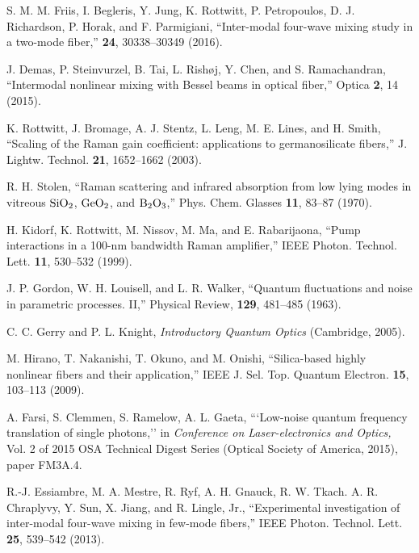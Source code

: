 \documentclass[10pt,letterpaper]{article}
\begin{document}
\begin{thebibliography}{99}
 S. M. M. Friis, I. Begleris, Y. Jung, K. Rottwitt, P. Petropoulos, D. J. Richardson, P. Horak, and F. Parmigiani, ``Inter-modal four-wave mixing study in a two-mode fiber,'' \opex \textbf{24}, 30338--30349 (2016).

 J. Demas, P. Steinvurzel, B. Tai, L. Rish\o{}j, Y. Chen, and S. Ramachandran, ``Intermodal nonlinear mixing with Bessel beams in optical fiber,'' Optica \textbf{2}, 14 (2015).

 K. Rottwitt, J. Bromage, A. J. Stentz, L. Leng, M. E. Lines, and H. Smith, ``Scaling of the Raman gain coefficient: applications to germanosilicate fibers,'' J. Lightw. Technol. \textbf{21}, 1652--1662 (2003).

 R. H. Stolen, ``Raman scattering and infrared absorption from low lying modes in vitreous $\rm SiO_2$, $\rm GeO_2$, and $\rm B_2 O_3$,'' Phys. Chem. Glasses \textbf{11}, 83--87 (1970).

 H. Kidorf, K. Rottwitt, M. Nissov, M. Ma, and E. Rabarijaona, ``Pump interactions in a 100-nm bandwidth Raman amplifier,'' IEEE Photon. Technol. Lett. \textbf{11}, 530--532 (1999).


 J. P. Gordon, W. H. Louisell, and L. R. Walker, ``Quantum fluctuations and noise in parametric processes. II,'' Physical Review, \textbf{129}, 481--485 (1963).

 C. C. Gerry and P. L. Knight, \textit{Introductory Quantum Optics} (Cambridge, 2005).

 M. Hirano, T. Nakanishi, T. Okuno, and M. Onishi, ``Silica-based highly nonlinear fibers and their application,''  IEEE J. Sel. Top. Quantum Electron. \textbf{15}, 103--113 (2009).

 A. Farsi, S. Clemmen, S. Ramelow, A. L. Gaeta, ```Low-noise quantum frequency translation of single photons,'' in \textit{Conference on Laser-electronics and Optics,} Vol. 2 of 2015 OSA Technical Digest Series (Optical Society of America, 2015), paper FM3A.4. 

 R.-J. Essiambre, M. A. Mestre, R. Ryf, A. H. Gnauck, R. W. Tkach. A. R. Chraplyvy, Y. Sun, X. Jiang, and R. Lingle, Jr., ``Experimental investigation of inter-modal four-wave mixing in few-mode fibers,'' IEEE Photon. Technol. Lett. \textbf{25}, 539--542 (2013).


\end{thebibliography}
\end{document}
